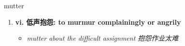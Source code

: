 
\begin{frame}
{\huge mutter}
\begin{center}
\begin{enumerate}\Large
  \item \textbf{vi. 低声抱怨: to murmur complainingly or angrily}
  \begin{itemize}
    \item \em{\Large{mutter about the difficult assignment 抱怨作业太难}}
  \end{itemize}
\end{enumerate}
\end{center}
\end{frame}
